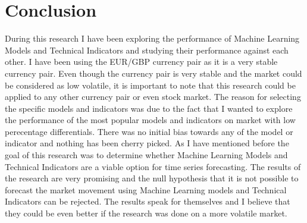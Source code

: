 \documentclass{imc-inf}
\begin{document}
	\section{Conclusion}
	During this research I have been exploring the performance of Machine Learning Models and Technical Indicators and studying their performance against each other. I have been using the EUR/GBP currency pair as it is a very stable currency pair.
	Even though the currency pair is very stable and the market could be considered as low volatile, it is important to note that this research could be applied to any other currency pair or even stock market.
	The reason for selecting the specific models and indicators was due to the fact that I wanted to explore the performance of the most popular models and indicators on market with low perecentage differentials.
	There was no initial bias towards any of the model or indicator and nothing has been cherry picked. As I have mentioned before the goal of this research was to determine whether Machine Learning Models 
	and Technical Indicators are a viable option for time series forecasting. The results of the research are very promising and the null hypothesis that it is not possible to forecast the market movement using Machine Learning models
	and Technical Indicators can be rejected. The results speak for themselves and I believe that they could be even better if the research was done on a more volatile market.
	



%
%
%
%
%

\backmatter%
	
 \typeout{}
	
	
\end{document}
